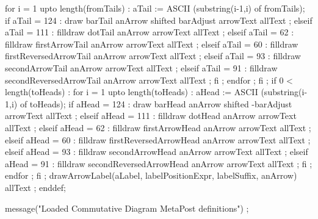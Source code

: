       for i = 1 upto length(fromTails) :
        aTail := ASCII (substring(i-1,i) of fromTails);
        if aTail = 124 : %
          draw barTail anArrow
            shifted barAdjust
            arrowText allText ;
        elseif aTail = 111 : %
          filldraw dotTail anArrow arrowText allText ;
        elseif aTail = 62 : %
          filldraw firstArrowTail anArrow arrowText allText ;
        elseif aTail = 60 : %
          filldraw firstReversedArrowTail anArrow arrowText allText ;
        elseif aTail = 93 : %
          filldraw secondArrowTail anArrow arrowText allText ;
        elseif aTail = 91 : %
          filldraw secondReversedArrowTail anArrow arrowText allText ;
        fi ;
      endfor ;
    fi ;
    if 0 < length(toHeads) :
      for i = 1 upto length(toHeads) :
        aHead := ASCII (substring(i-1,i) of toHeads);
        if aHead = 124 : %
          draw barHead anArrow
            shifted -barAdjust
            arrowText allText ;
        elseif aHead = 111 : %
          filldraw dotHead anArrow arrowText allText ;
        elseif aHead = 62 : %
          filldraw firstArrowHead anArrow arrowText allText ;
        elseif aHead = 60 : %
          filldraw firstReversedArrowHead anArrow arrowText allText ;
        elseif aHead = 93 : %
          filldraw secondArrowHead anArrow arrowText allText ;
        elseif aHead = 91 : %
          filldraw secondReversedArrowHead anArrow arrowText allText ;
        fi ;
      endfor ;
    fi ;
    drawArrowLabel(aLabel, labelPositionExpr, labelSuffix, anArrow) allText ;
  enddef;
\stopMPdefinitions

\stopMkIVCode

\startMpIVCode

message("Loaded Commutative Diagram MetaPost definitions") ;

\stopMpIVCode

\stopchapter